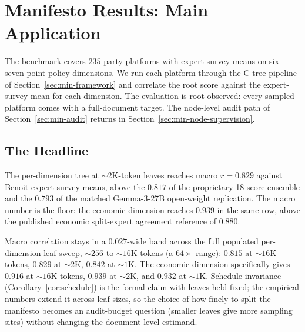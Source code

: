 \section{Manifesto Results: Main Application}\label{sec:min-manifesto-results}

The benchmark covers $235$ party platforms with expert-survey means on
six seven-point policy dimensions. We run each platform through the
C-tree pipeline of Section~\ref{sec:min-framework} and correlate the
root score against the expert-survey mean for each dimension. The
evaluation is root-observed: every sampled platform comes with a
full-document target. The node-level audit path of
Section~\ref{sec:min-audit} returns in
Section~\ref{sec:min-node-supervision}.

\subsection{The Headline}\label{sec:min-headline}

\begin{table}[t]
  \centering
  \resizebox{\linewidth}{!}{}
  \caption{\textbf{Pearson $r$ against Benoit expert-survey means.}
  The first block reproduces published Benoit reference rows; the
  remaining blocks report C-TreePO and controls using
  Gemma-4-31B-NVFP4. The headline is the per-dimension tree at the
  $\sim\!2\mathrm{K}$-token leaf row: macro $r=0.829$, above the
  proprietary ensemble's $0.817$ and the matched Gemma-3 open-weight
  replication's $0.793$.}
  \label{tab:min-benoit-headline}
\end{table}

The per-dimension tree at $\sim\!2\mathrm{K}$-token leaves reaches macro
$r=0.829$ against Benoit expert-survey means, above the $0.817$ of the
proprietary 18-score ensemble and the $0.793$ of the matched
Gemma-3-27B open-weight replication. The macro number is the floor:
the economic dimension reaches $0.939$ in the same row, above the
published economic split-expert agreement reference of $0.880$.

Macro correlation stays in a $0.027$-wide band across the full
populated per-dimension leaf sweep, $\sim\!256$ to $\sim\!16\mathrm{K}$
tokens (a $64\times$ range): $0.815$ at $\sim\!16\mathrm{K}$ tokens,
$0.829$ at $\sim\!2\mathrm{K}$, $0.842$ at $\sim\!1\mathrm{K}$. The
economic dimension specifically gives $0.916$ at $\sim\!16\mathrm{K}$
tokens, $0.939$ at $\sim\!2\mathrm{K}$, and $0.932$ at $\sim\!1\mathrm{K}$.
Schedule invariance (Corollary~\ref{cor:schedule}) is the formal claim
with leaves held fixed; the empirical numbers extend it across leaf
sizes, so the choice of how finely to split the manifesto becomes an
audit-budget question (smaller leaves give more sampling sites) without
changing the document-level estimand.

